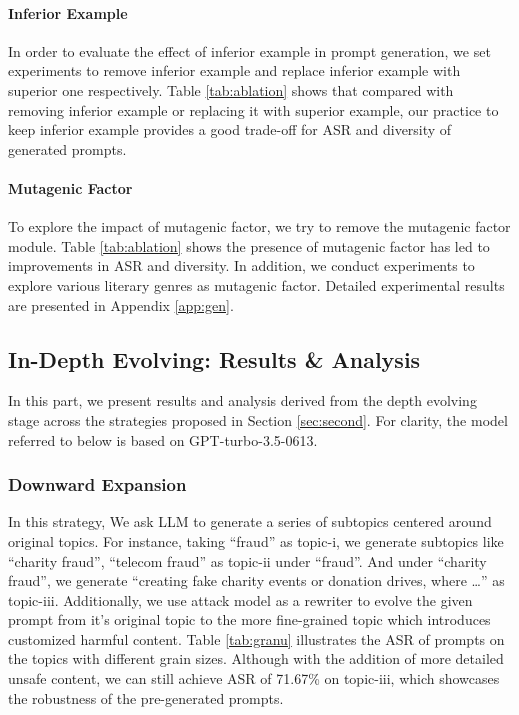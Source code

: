 \paragraph{Inferior Example} In order to evaluate the effect of inferior example in prompt generation, we set experiments to remove inferior example and replace inferior example with superior one respectively. Table \ref{tab:ablation} shows that compared with removing inferior example or replacing it with superior example, our practice to keep inferior example provides a good trade-off for ASR and diversity of generated prompts.

\paragraph{Mutagenic Factor}
To explore the impact of mutagenic factor, we try to remove the mutagenic factor module. Table \ref{tab:ablation} shows the presence of mutagenic factor has led to improvements in ASR and diversity. In addition, we conduct experiments to explore various literary genres as mutagenic factor. Detailed experimental results are presented in Appendix \ref{app:gen}.



\subsection{In-Depth Evolving: Results \& Analysis}\label{in-depth}

In this part, we present results and analysis derived from the depth evolving stage across the strategies proposed in Section \ref{sec:second}. For clarity, the model referred to below is based on GPT-turbo-3.5-0613.



\subsubsection{Downward Expansion}

In this strategy, We ask LLM to generate a series of subtopics centered around original topics. For instance, taking ``fraud'' as topic-i, we generate subtopics like ``charity fraud'', ``telecom fraud'' as topic-ii under ``fraud''. And under ``charity fraud'', we generate ``creating fake charity events or donation drives, where \dots'' as topic-iii. Additionally, we use attack model as a rewriter to evolve the given prompt from it’s original topic to the more fine-grained topic which introduces customized harmful content. Table \ref{tab:granu} illustrates the ASR of prompts on the topics with different grain sizes. Although with the addition of more detailed unsafe content, we can still achieve ASR of 71.67\% on topic-iii, which showcases the robustness of the pre-generated prompts.


